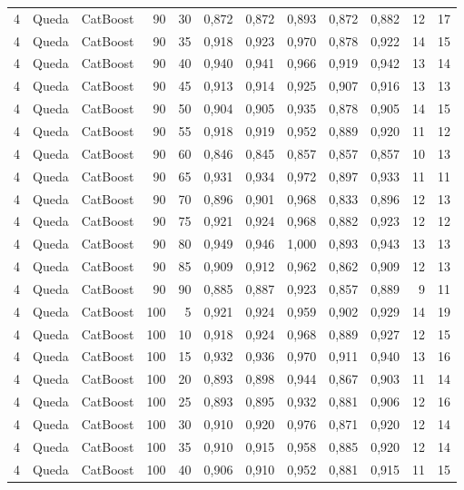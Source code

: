 \begin{longtable}{@{}rllrrrrrrrrr@{}}
4 & Queda & CatBoost & 90 & 30 & 0,872 & 0,872 & 0,893 & 0,872 & 0,882 & 12 & 17 \\
4 & Queda & CatBoost & 90 & 35 & 0,918 & 0,923 & 0,970 & 0,878 & 0,922 & 14 & 15 \\
4 & Queda & CatBoost & 90 & 40 & 0,940 & 0,941 & 0,966 & 0,919 & 0,942 & 13 & 14 \\
4 & Queda & CatBoost & 90 & 45 & 0,913 & 0,914 & 0,925 & 0,907 & 0,916 & 13 & 13 \\
4 & Queda & CatBoost & 90 & 50 & 0,904 & 0,905 & 0,935 & 0,878 & 0,905 & 14 & 15 \\
4 & Queda & CatBoost & 90 & 55 & 0,918 & 0,919 & 0,952 & 0,889 & 0,920 & 11 & 12 \\
4 & Queda & CatBoost & 90 & 60 & 0,846 & 0,845 & 0,857 & 0,857 & 0,857 & 10 & 13 \\
4 & Queda & CatBoost & 90 & 65 & 0,931 & 0,934 & 0,972 & 0,897 & 0,933 & 11 & 11 \\
4 & Queda & CatBoost & 90 & 70 & 0,896 & 0,901 & 0,968 & 0,833 & 0,896 & 12 & 13 \\
4 & Queda & CatBoost & 90 & 75 & 0,921 & 0,924 & 0,968 & 0,882 & 0,923 & 12 & 12 \\
4 & Queda & CatBoost & 90 & 80 & 0,949 & 0,946 & 1,000 & 0,893 & 0,943 & 13 & 13 \\
4 & Queda & CatBoost & 90 & 85 & 0,909 & 0,912 & 0,962 & 0,862 & 0,909 & 12 & 13 \\
4 & Queda & CatBoost & 90 & 90 & 0,885 & 0,887 & 0,923 & 0,857 & 0,889 & 9 & 11 \\
4 & Queda & CatBoost & 100 & 5 & 0,921 & 0,924 & 0,959 & 0,902 & 0,929 & 14 & 19 \\
4 & Queda & CatBoost & 100 & 10 & 0,918 & 0,924 & 0,968 & 0,889 & 0,927 & 12 & 15 \\
4 & Queda & CatBoost & 100 & 15 & 0,932 & 0,936 & 0,970 & 0,911 & 0,940 & 13 & 16 \\
4 & Queda & CatBoost & 100 & 20 & 0,893 & 0,898 & 0,944 & 0,867 & 0,903 & 11 & 14 \\
4 & Queda & CatBoost & 100 & 25 & 0,893 & 0,895 & 0,932 & 0,881 & 0,906 & 12 & 16 \\
4 & Queda & CatBoost & 100 & 30 & 0,910 & 0,920 & 0,976 & 0,871 & 0,920 & 12 & 14 \\
4 & Queda & CatBoost & 100 & 35 & 0,910 & 0,915 & 0,958 & 0,885 & 0,920 & 12 & 14 \\
4 & Queda & CatBoost & 100 & 40 & 0,906 & 0,910 & 0,952 & 0,881 & 0,915 & 11 & 15 \\

\end{longtable}
